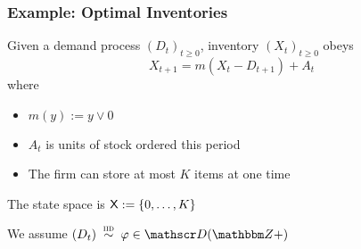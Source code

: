 




\begin{frame}
    \frametitle{Example: Optimal Inventories}

    Given a demand process $(D_t)_{t \geq 0}$, inventory $(X_t)_{t \geq 0}$
    obeys
    \begin{equation*}
        X_{t+1} = m(X_t - D_{t+1} ) + A_t
    \end{equation*}
    where

    \begin{itemize}
        \item $m(y) := y \vee 0$
    \vspace{0.5em}
        \item $A_t$ is units of stock ordered this period 
    \vspace{0.5em}
        \item The firm can store at most $K$ items at one time
    \end{itemize}

    \vspace{0.5em}
    The state space is $\mathsf X := \{0, \ldots, K\}$

    \vspace{0.5em}
    \vspace{0.5em}
    We assume $(D_t) \iidsim \phi \in \dD(\ZZ+)$  

\end{frame}

